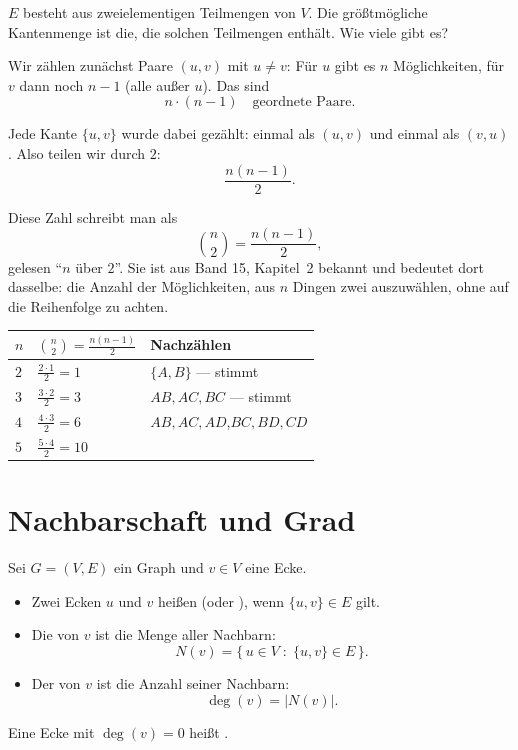 \begin{merksatz}
$E$ besteht aus zweielementigen Teilmengen von $V$. Die größtmögliche Kantenmenge ist die, die  solchen Teilmengen enthält. Wie viele gibt es?

Wir zählen zunächst  Paare $(u,v)$ mit $u \neq v$: Für $u$ gibt es $n$ Möglichkeiten, für $v$ dann noch $n-1$ (alle außer $u$). Das sind
\[ n \cdot (n-1) \quad \text{geordnete Paare.} \]

Jede Kante $\{u,v\}$ wurde dabei  gezählt: einmal als $(u,v)$ und einmal als $(v,u)$. Also teilen wir durch $2$:
\[ \frac{n(n-1)}{2} . \]

Diese Zahl schreibt man als 
\[ \binom{n}{2} = \frac{n(n-1)}{2}, \]
gelesen \enquote{$n$ über $2$}. Sie ist aus Band 15, Kapitel~2 bekannt und bedeutet dort dasselbe: die Anzahl der Möglichkeiten, aus $n$ Dingen zwei auszuwählen, ohne auf die Reihenfolge zu achten.

\begin{center}
\renewcommand{\arraystretch}{1.42}
\begin{tabular}{@{}P{1.2cm}P{2.6cm}P{3.4cm}@{}}
\toprule
$n$ & $\binom{n}{2} = \frac{n(n-1)}{2}$ & \textbf{Nachzählen}\\
\midrule
$2$ & $\frac{2 \cdot 1}{2} = 1$ & $\{A,B\}$ \quad --- stimmt\\
$3$ & $\frac{3 \cdot 2}{2} = 3$ & $AB, AC, BC$ --- stimmt\\
$4$ & $\frac{4 \cdot 3}{2} = 6$ & $AB, AC, AD$,\newline $BC, BD, CD$\\
$5$ & $\frac{5 \cdot 4}{2} = 10$ & \\
\bottomrule
\end{tabular}
\end{center}
\end{merksatz}

\section{Nachbarschaft und Grad}

\begin{definition}
Sei $G = (V,E)$ ein Graph und $v \in V$ eine Ecke.
\begin{itemize}[leftmargin=1.4em, itemsep=4pt]
\item Zwei Ecken $u$ und $v$ heißen  (oder ), wenn $\{u,v\} \in E$ gilt.
\item Die  von $v$ ist die Menge aller Nachbarn:
\[ N(v) = \{\, u \in V \;:\; \{u,v\} \in E \,\}. \]
\item Der  von $v$ ist die Anzahl seiner Nachbarn:
\[ \deg(v) = |N(v)| . \]
\end{itemize}
Eine Ecke mit $\deg(v) = 0$ heißt .
\end{definition}

